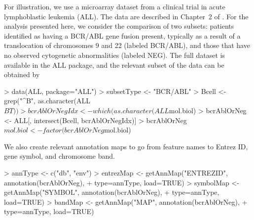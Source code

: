\documentclass[11pt]{article}
\newcommand{\Rpackage}[1]{{\textsf{#1}}}
\begin{document}
For illustration, we use a microarray dataset \citep{Chiaretti2005}
from a clinical trial in acute lymphoblastic leukemia (ALL).  The data
are described in Chapter~2 of \cite{biocCaseStudies}.  For the
analysis presented here, we consider the comparison of two subsets:
patients identified as having a BCR/ABL gene fusion present, typically
as a result of a translocation of chromosomes 9 and 22 (labeled
BCR/ABL), and those that have no observed cytogenetic abnormalities
(labeled NEG).  The full dataset is available in the \Rpackage{ALL}
package, and the relevant subset of the data can be obtained by
%
\begin{Schunk}
\begin{Sinput}
> data(ALL, package="ALL")
> subsetType <- "BCR/ABL"
> Bcell <- grep("^B", as.character(ALL$BT))
> bcrAblOrNegIdx <- which(as.character(ALL$mol.biol) %in% c("NEG", subsetType))
> bcrAblOrNeg <- ALL[, intersect(Bcell, bcrAblOrNegIdx)]
> bcrAblOrNeg$mol.biol <- factor(bcrAblOrNeg$mol.biol)
\end{Sinput}
\end{Schunk}
%
We also create relevant annotation maps to go from feature names to
Entrez ID, gene symbol, and chromosome band.
%
\begin{Schunk}
\begin{Sinput}
> annType <- c("db", "env")
> entrezMap <- getAnnMap("ENTREZID", annotation(bcrAblOrNeg),
+                        type=annType, load=TRUE)
> symbolMap <- getAnnMap("SYMBOL", annotation(bcrAblOrNeg),
+                        type=annType, load=TRUE)
> bandMap <- getAnnMap("MAP", annotation(bcrAblOrNeg),
+                      type=annType, load=TRUE)
\end{Sinput}
\end{Schunk}
%
\end{document}
